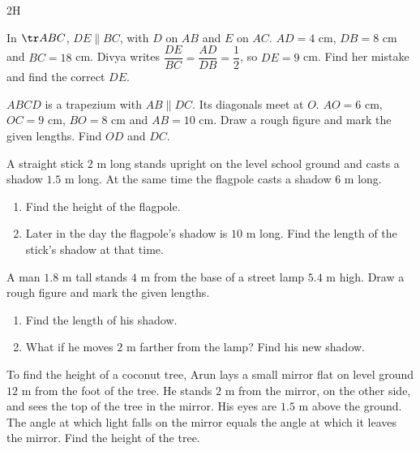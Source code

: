 \begin{exercise}{2H}
  \item In $\tr ABC$, $DE\parallel BC$, with $D$ on $AB$ and $E$ on $AC$. $AD=4$ cm, $DB=8$ cm and $BC=18$ cm. Divya writes $\dfrac{DE}{BC}=\dfrac{AD}{DB}=\dfrac12$, so $DE=9$ cm. Find her mistake and find the correct $DE$.
  \item $ABCD$ is a trapezium with $AB\parallel DC$. Its diagonals meet at $O$. $AO=6$ cm, $OC=9$ cm, $BO=8$ cm and $AB=10$ cm. Draw a rough figure and mark the given lengths. Find $OD$ and $DC$.
  \item A straight stick $2$ m long stands upright on the level school ground and casts a shadow $1.5$ m long. At the same time the flagpole casts a shadow $6$ m long.
  \begin{enumerate}[label=(\alph*),itemsep=1pt]
    \item Find the height of the flagpole.
    \item Later in the day the flagpole's shadow is $10$ m long. Find the length of the stick's shadow at that time.
  \end{enumerate}
  \item A man $1.8$ m tall stands $4$ m from the base of a street lamp $5.4$ m high. Draw a rough figure and mark the given lengths.
  \begin{enumerate}[label=(\alph*),itemsep=1pt]
    \item Find the length of his shadow.
    \item What if he moves $2$ m farther from the lamp? Find his new shadow.
  \end{enumerate}
  \item To find the height of a coconut tree, Arun lays a small mirror flat on level ground $12$ m from the foot of the tree. He stands $2$ m from the mirror, on the other side, and sees the top of the tree in the mirror. His eyes are $1.5$ m above the ground. The angle at which light falls on the mirror equals the angle at which it leaves the mirror. Find the height of the tree.
  \begin{center}
\end{center}
\end{exercise}

